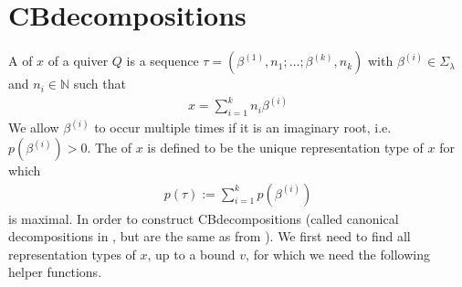 \documentclass[letterpaper,10pt,english]{sphinxmanual}
\begin{document}
\chapter{CB\sphinxhyphen{}decompositions}
\label{\detokenize{index:cb-decompositions}}
\sphinxAtStartPar
A  of \(x\) of a quiver \(Q\) is a sequence \(\tau=(\beta^{(1)},n_1;\dots;\beta^{(k)},n_k)\) with \(\beta^{(i)}\in\Sigma_\lambda\) and \(n_i\in\mathbb{N}\) such that
\begin{equation*}
\begin{split}x=\sum_{i=1}^k n_i\beta^{(i)}\end{split}
\end{equation*}
\sphinxAtStartPar
We allow \(\beta^{(i)}\) to occur multiple times if it is an imaginary root, i.e. \(p(\beta^{(i)})>0\). The  of \(x\) is defined to be the unique representation type of \(x\) for which
\begin{equation*}
\begin{split}p(\tau):=\sum_{i=1}^k p(\beta^{(i)})\end{split}
\end{equation*}
\sphinxAtStartPar
is maximal. In order to construct CB\sphinxhyphen{}decompositions (called canonical decompositions in , but are  the same as  from ). We first need to find all representation types of \(x\), up to a bound \(v\), for which we need the following helper functions.
\end{document}
